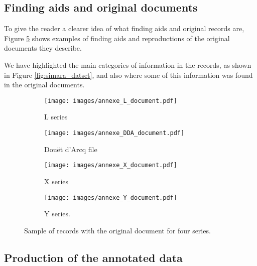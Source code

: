\documentclass[runningheads]{llncs}
\begin{document}
\subsection{Finding aids and original documents}
To give the reader a clearer idea of what finding aids and original records are, Figure \ref{fig:record_and_docs} shows examples of finding aids and reproductions of the original documents they describe. 

We have highlighted the main categories of information in the records, as shown in Figure \ref{fig:simara_datset}, and also where some of this information was found in the original documents. 

\begin{figure}[p]\begin{subfigure}[b]{0.45\textwidth}
    \centering
    \texttt{[image: images/annexe\_L\_document.pdf]}
    \caption{L series}
    \label{fig:l_series_document}
     \end{subfigure}
         \begin{subfigure}[b]{0.45\textwidth}
    \centering
    \texttt{[image: images/annexe\_DDA\_document.pdf]}
    \caption{Douët d'Arcq file}
    \label{fig:dda_series_document}
     \end{subfigure}
    \begin{subfigure}[b]{0.45\textwidth}
    \centering
    \texttt{[image: images/annexe\_X\_document.pdf]}
    \caption{X series}
    \label{fig:x_series_document}
     \end{subfigure}
    \begin{subfigure}[b]{0.5\textwidth}
    \centering
    \texttt{[image: images/annexe\_Y\_document.pdf]}
    \caption{Y series.}
    \label{fig:y_series_document}
     \end{subfigure}
     \caption{Sample of records with the original document for four series.}
     \label{fig:record_and_docs}

\end{figure}



\subsection{Production of the annotated data}
\end{document}
